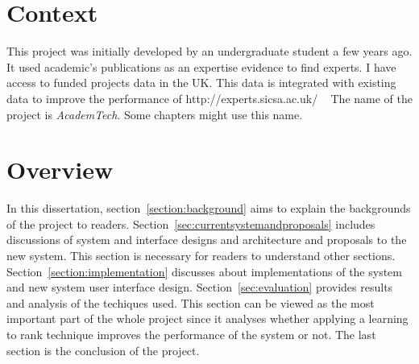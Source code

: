 \section{Context}
This project was initially developed by an undergraduate student a few years ago. It used academic's publications as an expertise evidence to find experts.
I have access to funded projects data in the UK. This data is integrated with existing data to improve the performance of http://experts.sicsa.ac.uk/ ~\cite{sicsasearch}
The name of the project is \textit{AcademTech}. Some chapters might use this name.

\section{Overview}
In this dissertation, section~\ref{section:background} aims to explain the backgrounds of the project to readers. 
Section~\ref{sec:currentsystemandproposals} includes discussions of system and interface designs and architecture and proposals to the new system.
This section is necessary for readers to understand other sections. 
Section~\ref{section:implementation} discusses about implementations of the system and new system user interface design. 
Section~\ref{sec:evaluation} provides results and analysis of the techiques used. 
This section can be viewed as the most important part of the whole project since it 
analyses whether applying a learning to rank technique improves the performance of the system or not. 
The last section is the conclusion of the project.
